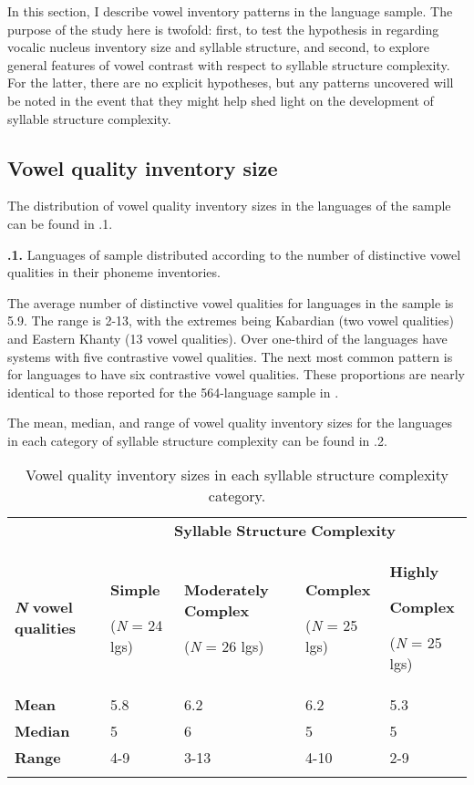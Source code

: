   In this section, I describe vowel inventory patterns in the language sample. The purpose of the study here is twofold: first, to test the hypothesis in  regarding vocalic nucleus inventory size and syllable structure, and second, to explore general features of vowel contrast with respect to syllable structure complexity. For the latter, there are no explicit hypotheses, but any patterns uncovered will be noted in the event that they might help shed light on the development of syllable structure complexity.

\subsection{Vowel quality inventory size}\label{sec:4.3.1}

  The distribution of vowel quality inventory sizes in the languages of the sample can be found in .1.

\textbf{.1.} Languages of sample distributed according to the number of distinctive vowel qualities in their phoneme inventories.

  The average number of distinctive vowel qualities for languages in the sample is 5.9. The range is 2-13, with the extremes being Kabardian (two vowel qualities) and Eastern Khanty (13 vowel qualities). Over one-third  of the languages have systems with five contrastive vowel qualities. The next most common pattern is for languages to have six contrastive vowel qualities. These proportions are nearly identical to those reported for the 564-language sample in \citet{Maddieson2013c}.

  The mean, median, and range of vowel quality inventory sizes for the languages in each category of syllable structure complexity can be found in .2.

\begin{table}
\begin{tabularx}{\textwidth}{XXXXX}
 & \multicolumn{4}{c}{ \textbf{Syllable} \textbf{Structure} \textbf{Complexity}}\\
\lsptoprule
\textbf{\textit{N}} \textbf{vowel} \textbf{qualities} & { \textbf{Simple}}

 (\textit{N} = 24 lgs) & { \textbf{Moderately} \textbf{Complex}}

 (\textit{N} = 26 lgs) & { \textbf{Complex}}

 (\textit{N} = 25 lgs) & { \textbf{Highly} }

{ \textbf{Complex}}

 (\textit{N} = 25 lgs)\\
\textbf{Mean} & 5.8 & 6.2 & 6.2 & 5.3\\
\textbf{Median} & 5 & 6 & 5 & 5\\
\textbf{Range} & 4-9 & 3-13 & 4-10 & 2-9\\
\lspbottomrule
\end{tabularx}
\caption{\label{4.2}Vowel quality inventory sizes in each syllable structure complexity category.}
\end{table}

